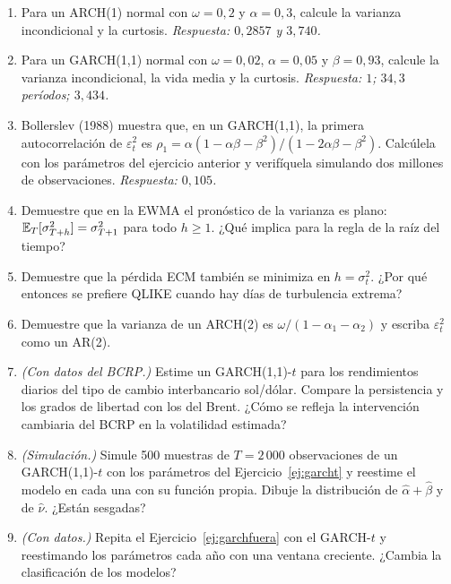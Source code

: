 \begin{enumerate}[label=\textbf{\thechapter.\arabic*},leftmargin=*,itemsep=6pt]
  \item Para un ARCH(1) normal con $\omega=0{,}2$ y $\alpha=0{,}3$, calcule la varianza incondicional y la
  curtosis. \textit{Respuesta: $0{,}2857$ y $3{,}740$.}

  \item Para un GARCH(1,1) normal con $\omega=0{,}02$, $\alpha=0{,}05$ y $\beta=0{,}93$, calcule la varianza
  incondicional, la vida media y la curtosis. \textit{Respuesta: $1$; $34{,}3$ períodos; $3{,}434$.}

  \item Bollerslev (1988) muestra que, en un GARCH(1,1), la primera autocorrelación de $\varepsilon_t^2$ es
  $\rho_1=\alpha(1-\alpha\beta-\beta^2)/(1-2\alpha\beta-\beta^2)$. Calcúlela con los parámetros del ejercicio
  anterior y verifíquela simulando dos millones de observaciones. \textit{Respuesta: $0{,}105$.}

  \item Demuestre que en la EWMA el pronóstico de la varianza es plano:
  $\mathbb{E}_T[\sigma_{T+h}^2]=\sigma_{T+1}^2$ para todo $h\ge1$. ¿Qué implica para la regla de la raíz del tiempo?

  \item Demuestre que la pérdida ECM también se minimiza en $h=\sigma_t^2$. ¿Por qué entonces se prefiere QLIKE
  cuando hay días de turbulencia extrema?

  \item Demuestre que la varianza de un ARCH(2) es $\omega/(1-\alpha_1-\alpha_2)$ y escriba $\varepsilon_t^2$
  como un AR(2).

  \item \emph{(Con datos del BCRP.)} Estime un GARCH(1,1)-$t$ para los rendimientos diarios del tipo de cambio
  interbancario sol/dólar. Compare la persistencia y los grados de libertad con los del Brent. ¿Cómo se refleja
  la intervención cambiaria del BCRP en la volatilidad estimada?

  \item \emph{(Simulación.)} Simule 500 muestras de $T=2\,000$ observaciones de un GARCH(1,1)-$t$ con los
  parámetros del Ejercicio~\ref{ej:garcht} y reestime el modelo en cada una con su función propia. Dibuje la
  distribución de $\hat\alpha+\hat\beta$ y de $\hat\nu$. ¿Están sesgadas?

  \item \emph{(Con datos.)} Repita el Ejercicio~\ref{ej:garchfuera} con el GARCH-$t$ y reestimando los
  parámetros cada año con una ventana creciente. ¿Cambia la clasificación de los modelos?
\end{enumerate}

